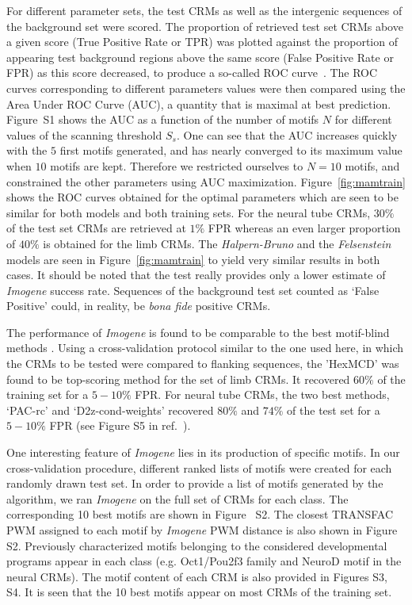 \documentclass[a4,center,fleqn]{NAR}
\begin{document}
For different parameter sets, the test CRMs  as well as the  intergenic
sequences of the background set  were scored.
The proportion of retrieved test set CRMs above a given score (True Positive
Rate or TPR) was plotted against the proportion of appearing test background
regions above the same score (False Positive Rate or FPR) as this score
decreased, to produce a  so-called ROC curve~\cite{hastie}. 
The ROC curves corresponding to different parameters values were then compared
using the Area Under ROC Curve (AUC), a quantity that is maximal at best
prediction.
Figure~S1
shows the AUC as a function of the number of motifs $N$ for
different values of the  scanning threshold $S_s$.
One can see that the AUC increases quickly with the $5$ first motifs generated,
and has nearly converged to its maximum value when $10$ motifs are kept.
Therefore we  restricted ourselves to  $N=10$ motifs, and constrained the other
parameters using AUC maximization.
Figure~\ref{fig:mamtrain} shows the ROC curves obtained for the optimal
parameters which are seen to be similar for both models and both training sets.
For the neural tube CRMs,  $30\%$ of the test set CRMs are retrieved at $1\%$ FPR
whereas an even larger proportion of $40\%$ is obtained for the limb
CRMs.
The {\em Halpern-Bruno} and  the {\em Felsenstein} models are seen in
Figure~\ref{fig:mamtrain}  to yield very similar results in both cases.
It should be noted that the test really provides only a lower estimate of {\em
Imogene} success rate.
Sequences of the background test set counted as `False Positive' could, in
reality,  be {\em bona fide} positive CRMs.

The performance of {\em Imogene} is found to be comparable to the best
motif-blind methods \cite{kantorovitz2009motif}.
Using a cross-validation protocol similar to the one used here, in which the
CRMs to be tested were compared to flanking sequences, the 'HexMCD' was found
to be top-scoring method for the set of limb CRMs.
It recovered $60 \%$ of the training set for a $5-10\%$ FPR.
For neural tube CRMs, the two best methods, `PAC-rc' and `D2z-cond-weights'
recovered  $80\%$ and $74\%$ of the test set for a $5-10\%$ FPR (see Figure S5
in ref.~\cite{kantorovitz2009motif}).

One interesting feature of {\em Imogene} lies in its production of specific
motifs.
In our cross-validation procedure, different ranked lists of motifs were
created for each randomly drawn test set. 
In order to provide a list of motifs generated by the algorithm, we ran {\em
Imogene} on the full set of CRMs for each class.
The corresponding 10 best motifs are shown in Figure~
S2.  
The closest TRANSFAC PWM  assigned to each motif by {\em Imogene} PWM distance
is also shown in Figure~
S2.
Previously characterized motifs belonging to the considered developmental
programs appear in each class (e.g. Oct1/Pou2f3 family and NeuroD motif in the neural CRMs).
The motif content of each CRM is also provided in Figures
S3, S4.
It is seen that the 10 best motifs appear on most CRMs of the training set.
\end{document}
